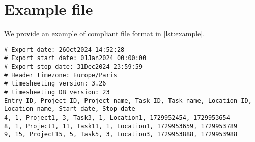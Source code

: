 \section{Example file} \label{sec:example}
We provide an example of compliant file format in \cref{lst:example}.

\begin{minipage}{\linewidth}
\begin{lstlisting}[caption={Compliant exported timesheet file.},
                   label={lst:example}]
# Export date: 26Oct2024 14:52:28
# Export start date: 01Jan2024 00:00:00
# Export stop date: 31Dec2024 23:59:59
# Header timezone: Europe/Paris
# timesheeting version: 3.26
# timesheeting DB version: 23
Entry ID, Project ID, Project name, Task ID, Task name, Location ID, Location name, Start date, Stop date
4, 1, Project1, 3, Task3, 1, Location1, 1729952454, 1729953654
8, 1, Project1, 11, Task11, 1, Location1, 1729953659, 1729953789
9, 15, Project15, 5, Task5, 3, Location3, 1729953888, 1729953988
\end{lstlisting} \end{minipage}
